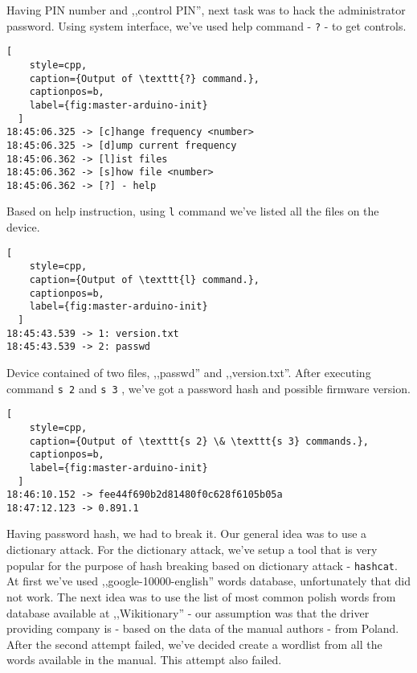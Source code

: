 Having PIN number and ,,control PIN'', next task was to hack the administrator password. Using system interface, we've used help command - \texttt{?} - to get controls.

\begin{minipage}{\linewidth}
  \begin{lstlisting}[
    style=cpp,
    caption={Output of \texttt{?} command.},
    captionpos=b,
    label={fig:master-arduino-init}
  ]
18:45:06.325 -> [c]hange frequency <number>
18:45:06.325 -> [d]ump current frequency
18:45:06.362 -> [l]ist files
18:45:06.362 -> [s]how file <number>
18:45:06.362 -> [?] - help
  \end{lstlisting}
  \end{minipage}

Based on help instruction, using \texttt{l} command we've listed all the files on the device.

\begin{minipage}{\linewidth}
  \begin{lstlisting}[
    style=cpp,
    caption={Output of \texttt{l} command.},
    captionpos=b,
    label={fig:master-arduino-init}
  ]
18:45:43.539 -> 1: version.txt
18:45:43.539 -> 2: passwd
  \end{lstlisting}
  \end{minipage}

Device contained of two files, ,,passwd'' and ,,version.txt''. After executing command \texttt{s 2} and \texttt{s 3} , we've got a password hash and possible firmware version.


\begin{minipage}{\linewidth}
  \begin{lstlisting}[
    style=cpp,
    caption={Output of \texttt{s 2} \& \texttt{s 3} commands.},
    captionpos=b,
    label={fig:master-arduino-init}
  ]
18:46:10.152 -> fee44f690b2d81480f0c628f6105b05a
18:47:12.123 -> 0.891.1
  \end{lstlisting}
  \end{minipage}

Having password hash, we had to break it. Our general idea was to use a dictionary attack. For the dictionary attack, we've setup a tool that is very popular for the purpose of hash breaking based on dictionary attack - \texttt{hashcat}. At first we've used ,,google-10000-english'' words database, unfortunately that did not work. The next idea was to use the list of most common polish words from database available at ,,Wikitionary'' - our assumption was that the driver providing company is - based on the data of the manual authors - from Poland. After the second attempt failed, we've decided create a wordlist from all the words available in the manual. This attempt also failed.

